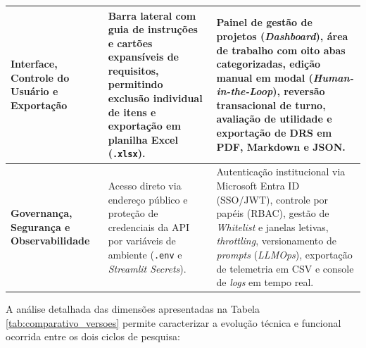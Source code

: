 {\begin{xltabular}{\textwidth}{|>{\raggedright\arraybackslash}p{2.8cm}|>{\raggedright\arraybackslash}X|>{\raggedright\arraybackslash}X|}
    \midrule
    \textbf{Interface, Controle do Usuário e Exportação} & Barra lateral com guia de instruções e cartões expansíveis de requisitos, permitindo exclusão individual de itens e exportação em planilha Excel (\texttt{.xlsx}). & Painel de gestão de projetos (\textit{Dashboard}), área de trabalho com oito abas categorizadas, edição manual em modal (\textit{Human-in-the-Loop}), reversão transacional de turno, avaliação de utilidade e exportação de DRS em PDF, Markdown e JSON. \\
    \midrule
    \textbf{Governança, Segurança e Observabilidade} & Acesso direto via endereço público e proteção de credenciais da API por variáveis de ambiente (\texttt{.env} e \textit{Streamlit Secrets}). & Autenticação institucional via Microsoft Entra ID (SSO/JWT), controle por papéis (RBAC), gestão de \textit{Whitelist} e janelas letivas, \textit{throttling}, versionamento de \textit{prompts} (\textit{LLMOps}), exportação de telemetria em CSV e console de \textit{logs} em tempo real. \\
\end{xltabular}
}

A análise detalhada das dimensões apresentadas na Tabela \ref{tab:comparativo_versoes} permite caracterizar a evolução técnica e funcional ocorrida entre os dois ciclos de pesquisa:


